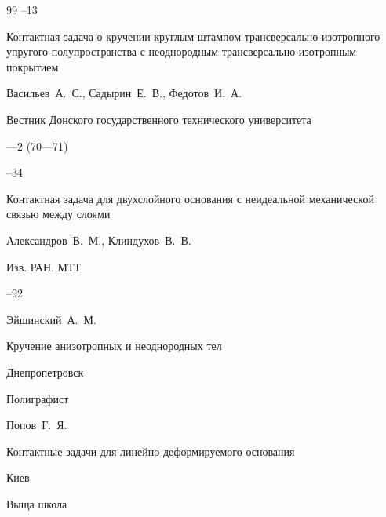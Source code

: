 \begin{thebibliography}{99}
--13






\paper Контактная задача о кручении круглым штампом трансверсально-изотропного упругого полупространства с неоднородным трансверсально-изотропным покрытием

\by Васильев~А.~С., Садырин~Е.~В., Федотов~И.~А.

\jour Вестник Донского государственного технического университета


—2 (70—71)

--34







\paper Контактная задача для двухслойного основания с неидеальной механической связью между слоями 

\by Александров~В.~М., Клиндухов~В.~В. 

\jour Изв. РАН. МТТ



--92




\by Эйшинский~А.~М. 

\book Кручение анизотропных и неоднородных тел 

\publaddr Днепропетровск 

\publ Полиграфист 






\by Попов~Г.~Я. 

\book Контактные задачи для линейно-деформируемого основания

\publaddr Киев

\publ Выща школа









\end{thebibliography}



